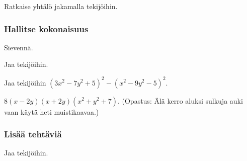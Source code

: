 \begin{tehtavasivu}
\begin{tehtava}
	Ratkaise yhtälö jakamalla tekijöihin.
	\begin{vastaus}
	\end{vastaus}
\end{tehtava}


\subsubsection*{Hallitse kokonaisuus}

\begin{tehtava}
    Sievennä.
    \begin{vastaus}
    \end{vastaus}
\end{tehtava}

\begin{tehtava}
	Jaa tekijöihin.
	\begin{vastaus}
	\end{vastaus}
\end{tehtava}

\begin{tehtava} 
Jaa tekijöihin $(3x^2-7y^2+5)^2-(x^2-9y^2-5)^2$.
    \begin{vastaus}
		$8(x-2y)(x+2y)(x^2+y^2+7)$. (Opastus: Älä kerro aluksi sulkuja auki vaan käytä heti muistikaavaa.)
    \end{vastaus}
\end{tehtava}

\subsubsection*{Lisää tehtäviä}

\begin{tehtava}
    Jaa tekijöihin.
    \begin{vastaus}
    \end{vastaus}
\end{tehtava}


\end{tehtavasivu}
